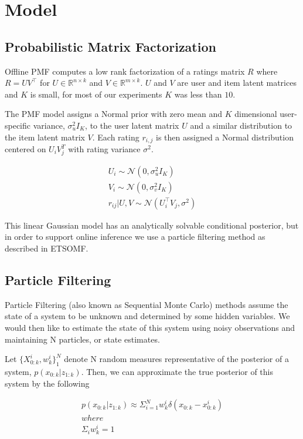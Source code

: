 \documentclass{article}
\begin{document}
\section{Model}

\subsection{Probabilistic Matrix Factorization}
Offline PMF computes a low rank factorization of a ratings matrix $R$ where $R = UV^\top$ for $U \in \mathbb{R}^{n \times k}$
and $V \in \mathbb{R}^{m \times k}$. $U$ and $V$ are user and item latent matrices and $K$ is small, for most of our experiments $K$ was less than $10$.

The PMF model assigns a Normal prior with zero mean and $K$ dimensional user-specific variance, $\sigma_u^2 I_K$, to the user latent matrix $U$ and a similar distribution to the item latent matrix $V$. Each rating $r_{i,j}$ is then assigned a Normal distribution centered on $U_iV_j^T$ with rating variance $\sigma^2$.

\begin{gather*}
U_i \sim \mathcal{N}(0, \sigma_u^2 I_K) \\
V_i \sim \mathcal{N}(0, \sigma_v^2 I_K) \\
r_{ij} | U, V \sim \mathcal{N}(U_i^\top V_j, \sigma^2)
\end{gather*}

This linear Gaussian model has an analytically solvable conditional posterior, but in order to support online inference we use a particle filtering method as described in ETSOMF.

\subsection{Particle Filtering}
Particle Filtering (also known as Sequential Monte Carlo) methods assume the state of a system to be unknown and determined by some hidden variables. We would then like to estimate the state of this system using noisy observations and maintaining N particles, or state estimates.

Let $\{X_{0:k}^i, w_k^i\}_1^N$ denote N random measures representative of the posterior of a system, $p(x_{0:k}| z_{1:k})$. Then, we can approximate the true posterior of this system by the following

\begin{gather*}
    p(x_{0:k}| z_{1:k}) \approx \Sigma_{i=1}^{N}w^i_k \delta(x_{0:k} - x^i_{0:k}) \\
    where \\
    \Sigma_i w_k^i = 1
\end{gather*}
\end{document}
